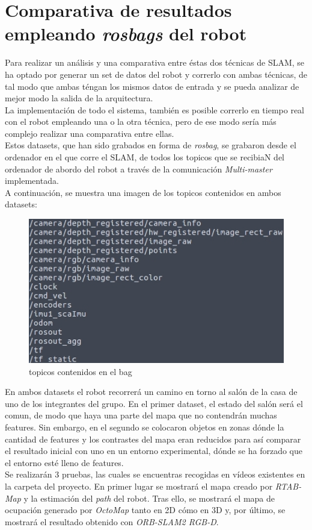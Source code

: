 \section{Comparativa de resultados empleando \textit{rosbags} del robot}
Para realizar un análisis y una comparativa entre éstas dos técnicas de SLAM, se ha optado por generar un set de datos del robot y correrlo con ambas técnicas,
de tal modo que ambas téngan los mismos datos de entrada y se pueda analizar de mejor modo la salida de la arquitectura. \\
La implementación de todo el sistema, también es posible correrlo en tiempo real con el robot empleando una o la otra técnica, pero de ese modo sería más complejo
realizar una comparativa entre ellas. \\
Estos datasets, que han sido grabados en forma de \textit{rosbag}, se grabaron desde el ordenador en el que corre el SLAM, de todos los topicos que se recibiaN
del ordenador de abordo del robot a través de la comunicación \textit{Multi-master} implementada.\\
A continuación, se muestra una imagen de los topicos contenidos en ambos datasets:
\begin{figure}[h!]
    \centering
    \includegraphics[width=.5\textwidth]{images/topics_bags}
    \caption{topicos contenidos en el bag}
\end{figure}

En ambos datasets el robot recorrerá un camino en torno al salón de la casa de uno de los integrantes del grupo. En el primer dataset, el estado del salón será 
el comun, de modo que haya una parte del mapa que no contendrán muchas features. Sin embargo, en el segundo se colocaron objetos en zonas dónde la cantidad de features
y los contrastes del mapa eran reducidos para así comparar el resultado inicial con uno en un entorno experimental, dónde se ha forzado que el entorno esté lleno de features.\\

Se realizarán 3 pruebas, las cuales se encuentras recogidas en vídeos existentes en la carpeta del proyecto. En primer lugar se mostrará el mapa creado por \textit{RTAB-Map} y
la estimación del \textit{path} del robot. Tras ello, se mostrará el mapa de ocupación generado por \textit{OctoMap} tanto en 2D cómo en 3D y, por último, se mostrará el
resultado obtenido con \textit{ORB-SLAM2 RGB-D}. \\

